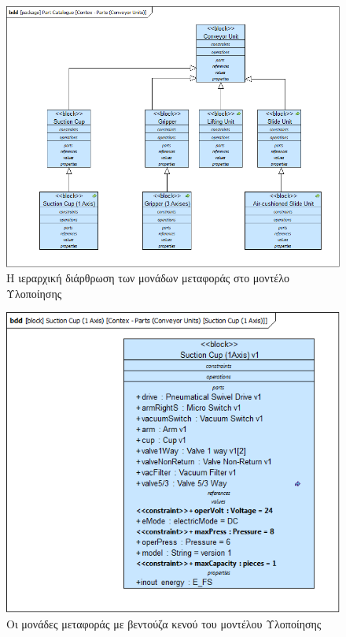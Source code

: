 \documentclass[a4paper,12pt,twoside]{report}
\begin{document}
\begin{appendices}
				\begin{figure}[hp]
					\centering
					\includegraphics[scale=0.50]{DesignModel_Contex-Parts(ConveyorUnits).png}
					\caption{Η ιεραρχική διάρθρωση των μονάδων μεταφοράς στο μοντέλο Υλοποίησης}
					\label{φωτ:Η ιεραρχική διάρθρωση των μονάδων μεταφοράς στο μοντέλο Υλοποίησης}
				\end{figure}
				
				\begin{figure}[hp]
					\centering
					\includegraphics[scale=0.50]{DesignModel_Contex-Parts(ConveyorUnits)[SuctionCup(1Axis)].png}
					\caption{Οι μονάδες μεταφοράς με βεντούζα κενού του μοντέλου Υλοποίησης}
					\label{φωτ:Οι μονάδες μεταφοράς με βεντούζα κενού του μοντέλου Υλοποίησης}
				\end{figure}
				

\end{appendices}
\end{document}
